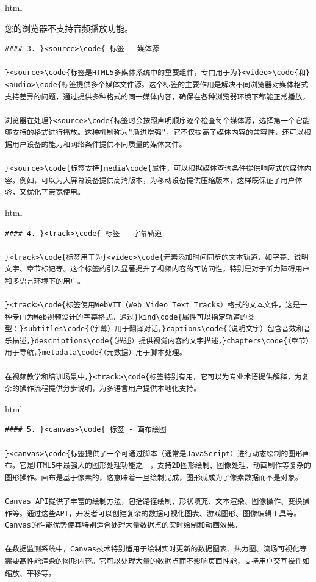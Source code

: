 html

您的浏览器不支持音频播放功能。

\begin{lstlisting}
#### 3. }<source>\code{ 标签 - 媒体源

}<source>\code{标签是HTML5多媒体系统中的重要组件，专门用于为}<video>\code{和}<audio>\code{标签提供多个媒体文件源。这个标签的主要作用是解决不同浏览器对媒体格式支持差异的问题，通过提供多种格式的同一媒体内容，确保在各种浏览器环境下都能正常播放。

浏览器在处理}<source>\code{标签时会按照声明顺序逐个检查每个媒体源，选择第一个它能够支持的格式进行播放。这种机制称为"渐进增强"，它不仅提高了媒体内容的兼容性，还可以根据用户设备的能力和网络条件提供不同质量的媒体文件。

}<source>\code{标签支持}media\code{属性，可以根据媒体查询条件提供响应式的媒体内容。例如，可以为大屏幕设备提供高清版本，为移动设备提供压缩版本，这样既保证了用户体验，又优化了带宽使用。

\end{lstlisting}

html

\begin{lstlisting}
#### 4. }<track>\code{ 标签 - 字幕轨道

}<track>\code{标签用于为}<video>\code{元素添加时间同步的文本轨道，如字幕、说明文字、章节标记等。这个标签的引入显著提升了视频内容的可访问性，特别是对于听力障碍用户和多语言环境下的用户。

}<track>\code{标签使用WebVTT（Web Video Text Tracks）格式的文本文件，这是一种专门为Web视频设计的字幕格式。通过}kind\code{属性可以指定轨道的类型：}subtitles\code{（字幕）用于翻译对话，}captions\code{（说明文字）包含音效和音乐描述，}descriptions\code{（描述）提供视觉内容的文字描述，}chapters\code{（章节）用于导航，}metadata\code{（元数据）用于脚本处理。

在视频教学和培训场景中，}<track>\code{标签特别有用，它可以为专业术语提供解释，为复杂的操作流程提供分步说明，为多语言用户提供本地化支持。

\end{lstlisting}

html

\begin{lstlisting}
#### 5. }<canvas>\code{ 标签 - 画布绘图

}<canvas>\code{标签提供了一个可通过脚本（通常是JavaScript）进行动态绘制的图形画布。它是HTML5中最强大的图形处理功能之一，支持2D图形绘制、图像处理、动画制作等复杂的图形操作。画布是基于像素的，这意味着一旦绘制完成，图形就成为了像素数据而不是对象。

Canvas API提供了丰富的绘制方法，包括路径绘制、形状填充、文本渲染、图像操作、变换操作等。通过这些API，开发者可以创建复杂的数据可视化图表、游戏图形、图像编辑工具等。Canvas的性能优势使其特别适合处理大量数据点的实时绘制和动画效果。

在数据监测系统中，Canvas技术特别适用于绘制实时更新的数据图表、热力图、流场可视化等需要高性能渲染的图形内容。它可以处理大量的数据点而不影响页面性能，支持用户交互操作如缩放、平移等。

\end{lstlisting}

